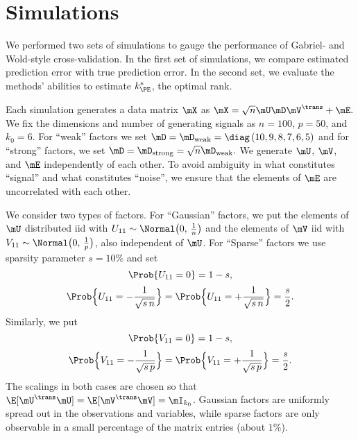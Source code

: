 \clearpage

\section{Simulations}

We performed two sets of simulations to gauge the performance of Gabriel- and Wold-style cross-validation.  In the first set of simulations, we compare estimated prediction error with true prediction error.  In the second set, we evaluate the methods' abilities to estimate $k_{\PE}^\ast$, the optimal rank.

Each simulation generates a data matrix $\mX$ as 
\(
    \mX = \sqrt{n} \mU \mD \mV^\trans + \mE.
\)
We fix the dimensions and number of generating signals as $n = 100$, $p = 50$,
and $k_0 = 6$.  For ``weak'' factors we set 
\(
    \mD 
    = 
    \mD_\text{weak}
    =
    \diag \left(
        10, 9, 8, 7, 6, 5
    \right)
\)
and for ``strong'' factors, we set
\(
    \mD
    =
    \mD_\text{strong}
    =
    \sqrt{n} \mD_\text{weak}.
\)
We generate $\mU$, $\mV$, and $\mE$ independently of each other.  To avoid 
ambiguity in what constitutes ``signal'' and what constitutes ``noise'', we 
ensure that the elements of $\mE$ are uncorrelated with each other.

We consider two types of factors.  For ``Gaussian'' factors, we put the elements of $\mU$ distributed iid with
$U_{11} \sim \Normal\big( 0, \, \frac{1}{n} \big)$ and the elements of
$\mV$ iid with $V_{11} \sim \Normal\big( 0, \, \frac{1}{p} \big)$, also independent of $\mU$.  For ``Sparse'' factors we use sparsity parameter $s = 10\%$ and set
\[
    \Prob\{ U_{11} = 0 \} = 1 - s,
\]
\[
    \Prob\Big\{ U_{11} = -\frac{1}{\sqrt{s \, n}} \Big\}
    =
    \Prob\Big\{ U_{11} = +\frac{1}{\sqrt{s \, n}} \Big\}    
    = 
    \frac{s}{2}.
\]
Similarly, we put
\[
    \Prob\{ V_{11} = 0 \} = 1 - s,
\]
\[
    \Prob\Big\{ V_{11} = -\frac{1}{\sqrt{s \, p}} \Big\}
    =
    \Prob\Big\{ V_{11} = +\frac{1}{\sqrt{s \, p}} \Big\}    
    = 
    \frac{s}{2}.
\]
The scalings in both cases are chosen so that $\E [\mU^\trans \mU] = \E 
[\mV^\trans \mV] = \mI_{k_0}$.  Gaussian factors are uniformly spread out in the observations and variables, while sparse factors are only observable in a small percentage of the matrix entries (about $1\%$).

